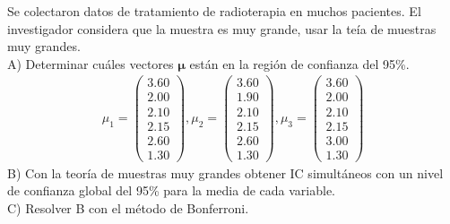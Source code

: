 \begin{problem}{2}
Se colectaron datos de tratamiento de radioterapia en muchos pacientes. El investigador considera que la muestra es muy grande, usar la teía de muestras muy grandes.\\
 A) Determinar cuáles vectores $\mathbf{\mu}$ están en la región de confianza del 95\%. 
\begin{align*}
\mu_1 = \begin{pmatrix} 3.60 \\ 2.00 \\ 2.10 \\ 2.15 \\ 2.60 \\ 1.30 \end{pmatrix}, 
\mu_2 = \begin{pmatrix} 3.60 \\ 1.90 \\ 2.10 \\ 2.15 \\ 2.60 \\ 1.30 \end{pmatrix}, 
\mu_3 = \begin{pmatrix} 3.60 \\ 2.00 \\ 2.10 \\ 2.15 \\ 3.00 \\ 1.30 \end{pmatrix}
\end{align*}
B) Con la teoría de muestras muy grandes obtener IC simultáneos con un nivel de confianza global del 95\% para la media de cada variable.\\
C) Resolver B con el método de Bonferroni.
\end{problem}
